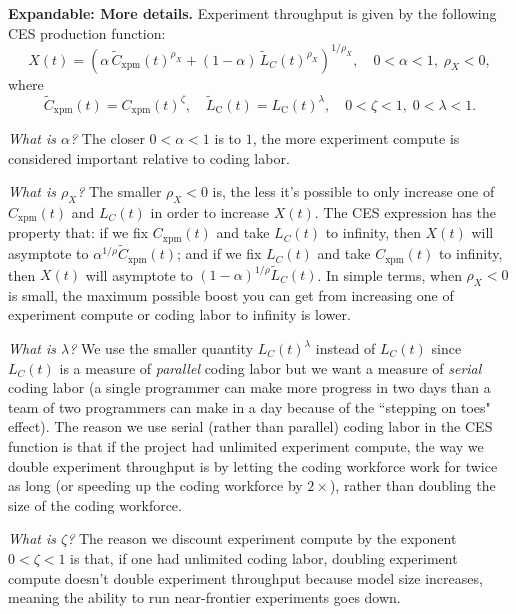 \documentclass{article}
\theoremstyle{definition}
\newcommand{\ESUG}[1]{\textcolor{purple}{ELI-SUGGESTION: #1}}
\newcommand{\ASUG}[1]{\textcolor{magenta}{ALEX-SUGGESTION: #1}}
\begin{document}
\textbf{Expandable: More details.} Experiment throughput is given by the following CES production function:
\[ X(t) = \left( \alpha \, \tilde{C}_{\text{xpm}}(t)^{\rho_X} + (1-\alpha) \, \tilde{L}_C(t)^{\rho_X} \right)^{1/\rho_X}, \quad 0 < \alpha < 1,\; \rho_X < 0,\]
where
\[\tilde C_{\text{xpm}}(t) = C_{\text{xpm}}(t)^\zeta, \quad \tilde L_{\text{C}}(t) = L_{\text{C}}(t)^\lambda, \quad 0 < \zeta < 1,\; 0 < \lambda < 1.\]

\textit{What is $\alpha$?} The closer $0< \alpha < 1$ is to $1$, the more experiment compute is considered important relative to coding labor. 

\textit{What is $\rho_X$?} The smaller $\rho_X < 0$ is, the less it's possible to only increase one of $C_{\text{xpm}}(t)$ and $L_C(t)$ in order to increase $X(t)$. The CES expression has the property that: if we fix $C_\text{xpm}(t)$ and take $L_C(t)$ to infinity, then $X(t)$ will asymptote to $\alpha^{1/\rho} \tilde{C}_\text{xpm}(t)$; and if we fix $L_C(t)$ and take $C_\text{xpm}(t)$ to infinity, then $X(t)$ will asymptote to $(1-\alpha)^{1/\rho} \tilde{L}_C(t)$. In simple terms, when $\rho_X < 0$ is small, the maximum possible boost you can get from increasing one of experiment compute or coding labor to infinity is lower.

\textit{What is $\lambda$?} We use the smaller quantity $L_C(t)^\lambda$ instead of $L_C(t)$ since $L_C(t)$ is a measure of \textit{parallel} coding labor but we want a measure of \textit{serial} coding labor (a single programmer can make more progress in two days than a team of two programmers can make in a day because of the ``stepping on toes" effect). The reason we use serial (rather than parallel) coding labor in the CES function is that if the project had unlimited experiment compute, the way we double experiment throughput is by letting the coding workforce work for twice as long (or speeding up the coding workforce by $2 \times$), rather than doubling the size of the coding workforce.

\textit{What is $\zeta$?} The reason we discount experiment compute by the exponent \(0<\zeta<1\) is that, if one had unlimited coding labor, doubling experiment compute doesn't double experiment throughput because model size increases, meaning the ability to run near-frontier experiments goes down.

\end{document}
